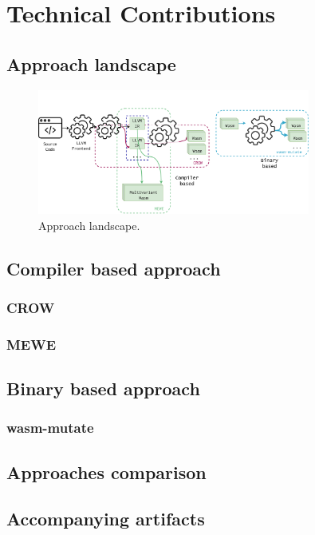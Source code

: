 \chapter{Technical Contributions}
\label{tech}

\section{Approach landscape}

\begin{figure}
	\centering
	\includegraphics[width=0.8\textwidth]{figures/landscape.pdf}
	\caption{Approach landscape.}
	\label{fig:approach_landscape}
\end{figure}

\section{Compiler based approach}

\subsection{CROW}

\subsection{MEWE}

\section{Binary based approach}

\subsection{wasm-mutate}

\section{Approaches comparison}

\section{Accompanying artifacts}